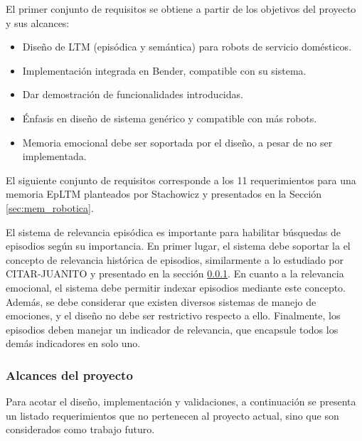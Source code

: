 El primer conjunto de requisitos se obtiene a partir de los objetivos del proyecto y sus alcances:
\begin{itemize}
\item Diseño de LTM (episódica y semántica) para robots de servicio domésticos.
\item Implementación integrada en Bender, compatible con su sistema.
\item Dar demostración de funcionalidades introducidas.
\item Énfasis en diseño de sistema genérico y compatible con más robots.
\item Memoria emocional debe ser soportada por el diseño, a pesar de no ser implementada.
\end{itemize}

El siguiente conjunto de requisitos corresponde a los 11 requerimientos para una memoria EpLTM planteados por Stachowicz\cite{Stachowicz2012} y presentados en la Sección \ref{sec:mem_robotica}. 

El sistema de relevancia episódica es importante para habilitar búsquedas de episodios según su importancia. En primer lugar, el sistema debe soportar la el concepto de relevancia histórica de episodios, similarmente a lo estudiado por CITAR-JUANITO \cite{} y presentado en la sección \ref{}. En cuanto a la relevancia emocional, el sistema debe permitir indexar episodios mediante este concepto. Además, se debe considerar que existen diversos sistemas de manejo de emociones, y el diseño no debe ser restrictivo respecto a ello. Finalmente, los episodios deben manejar un indicador de relevancia, que encapsule todos los demás indicadores en solo uno.

\subsubsection{Alcances del proyecto}


Para acotar el diseño, implementación y validaciones, a continuación se presenta un listado requerimientos que no pertenecen al proyecto actual, sino que son considerados como trabajo futuro.

